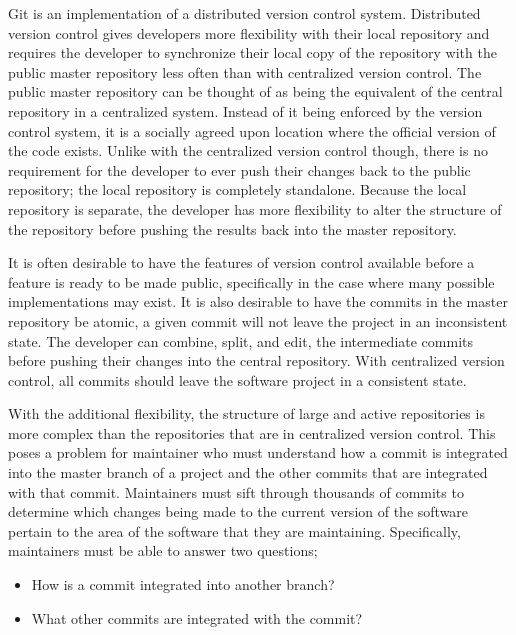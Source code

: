 Git is an implementation of a distributed version control system.
Distributed version control gives developers more flexibility with their
local repository and requires the developer to synchronize their local
copy of the repository with the public master repository less often
than with centralized version control.
The public master repository can be thought of as being the equivalent
of the central repository in a centralized system.
Instead of it being enforced by the version control system,
it is a socially agreed upon location where the official version of the
code exists.
Unlike with the centralized version control though,
there is no requirement for the developer to ever push their changes
back to the public repository;
the local repository is completely standalone.
Because the local repository is separate, the developer has more
flexibility to alter the structure of the repository before pushing
the results back into the master repository.

It is often desirable to have the features of version control available
before a feature is ready to be made public, specifically in the case
where many possible implementations may exist.
It is also desirable to have the commits in the master repository be
atomic, a given commit will not leave the project in an inconsistent
state.
The developer can combine, split, and edit, the intermediate commits
before pushing their changes into the central repository.
With centralized version control, all commits should leave the software
project in a consistent state.

With the additional flexibility, the structure of large and active
repositories is more complex than the repositories that are in
centralized version control. This poses a problem for maintainer who
must understand how a commit is integrated into the master branch of a
project and the other commits that are integrated with that commit.
Maintainers must sift through thousands of commits to determine which
changes being made to the current version of the software pertain to
the area of the software that they are maintaining.
Specifically, maintainers must be able to answer two questions;

\begin{textbox}
\begin{itemize}
  \item How is a commit integrated into another branch?
  \item What other commits are integrated with the commit?
\end{itemize}
\end{textbox}

